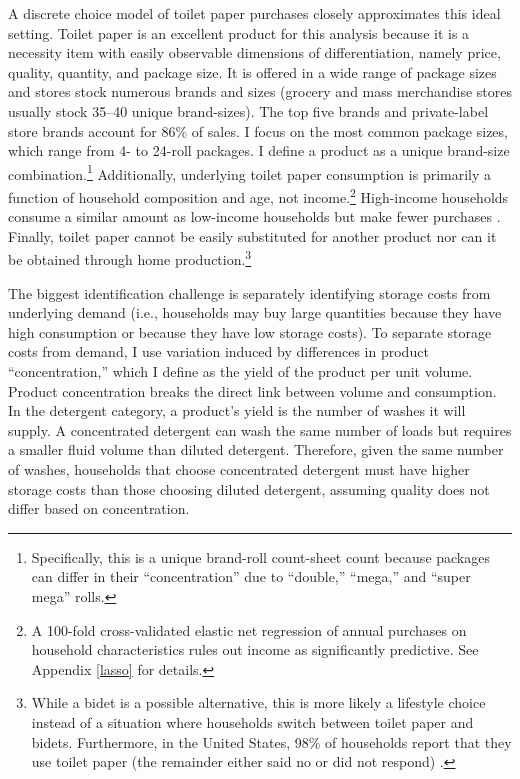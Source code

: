\documentclass[AER]{AEA_mal}
\begin{document}
A discrete choice model of toilet paper purchases closely approximates this ideal setting. Toilet paper is an excellent product for this analysis because it is a necessity item with easily observable dimensions of differentiation, namely price, quality, quantity, and package size. It is offered in a wide range of package sizes and stores stock numerous brands and sizes (grocery and mass merchandise stores usually stock 35--40 unique brand-sizes). The top five brands and private-label store brands account for 86\% of sales. I focus on the most common package sizes, which range from 4- to 24-roll packages. I define a product as a unique brand-size combination.\footnote{Specifically, this is a unique brand-roll count-sheet count because packages can differ in their ``concentration'' due to ``double,'' ``mega,'' and ``super mega'' rolls.} Additionally, underlying toilet paper consumption is primarily a function of household composition and age, not income.\footnote{A 100-fold cross-validated elastic net regression of annual purchases on household characteristics rules out income as significantly predictive. See Appendix \ref{lasso} for details.} High-income households consume a similar amount as low-income households but make fewer purchases \citep{orhun2018}. Finally, toilet paper cannot be easily substituted for another product nor can it be obtained through home production.\footnote{While a bidet is a possible alternative, this is more likely a lifestyle choice instead of a situation where households switch between toilet paper and bidets. Furthermore, in the United States, 98\% of households report that they use toilet paper (the remainder either said no or did not respond) \citep{statista2019}.}

The biggest identification challenge is separately identifying storage costs from underlying demand (i.e., households may buy large quantities because they have high consumption or because they have low storage costs). To separate storage costs from demand, I use variation induced by differences in product ``concentration,'' which I define as the yield of the product per unit volume. Product concentration breaks the direct link between volume and consumption. In the detergent category, a product's yield is the number of washes it will supply. A concentrated detergent can wash the same number of loads but requires a smaller fluid volume than diluted detergent. Therefore, given the same number of washes, households that choose concentrated detergent must have higher storage costs than those choosing diluted detergent, assuming quality does not differ based on concentration.
\end{document}
